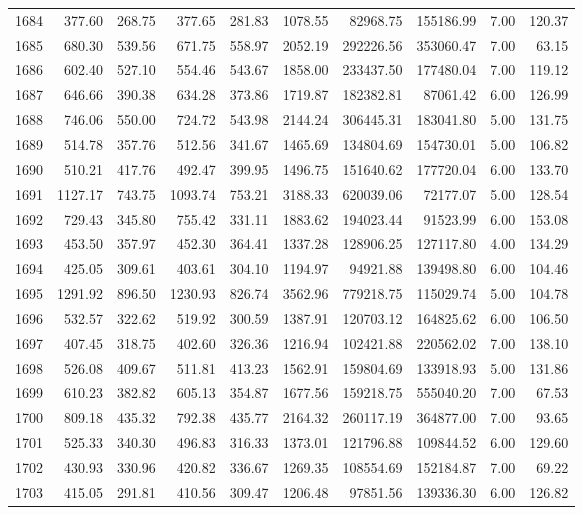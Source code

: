 \begin{tabular}{lrrrrrrrrr}
1684 & 377.60 & 268.75 & 377.65 & 281.83 & 1078.55 & 82968.75 & 155186.99 & 7.00 & 120.37 \\
1685 & 680.30 & 539.56 & 671.75 & 558.97 & 2052.19 & 292226.56 & 353060.47 & 7.00 & 63.15 \\
1686 & 602.40 & 527.10 & 554.46 & 543.67 & 1858.00 & 233437.50 & 177480.04 & 7.00 & 119.12 \\
1687 & 646.66 & 390.38 & 634.28 & 373.86 & 1719.87 & 182382.81 & 87061.42 & 6.00 & 126.99 \\
1688 & 746.06 & 550.00 & 724.72 & 543.98 & 2144.24 & 306445.31 & 183041.80 & 5.00 & 131.75 \\
1689 & 514.78 & 357.76 & 512.56 & 341.67 & 1465.69 & 134804.69 & 154730.01 & 5.00 & 106.82 \\
1690 & 510.21 & 417.76 & 492.47 & 399.95 & 1496.75 & 151640.62 & 177720.04 & 6.00 & 133.70 \\
1691 & 1127.17 & 743.75 & 1093.74 & 753.21 & 3188.33 & 620039.06 & 72177.07 & 5.00 & 128.54 \\
1692 & 729.43 & 345.80 & 755.42 & 331.11 & 1883.62 & 194023.44 & 91523.99 & 6.00 & 153.08 \\
1693 & 453.50 & 357.97 & 452.30 & 364.41 & 1337.28 & 128906.25 & 127117.80 & 4.00 & 134.29 \\
1694 & 425.05 & 309.61 & 403.61 & 304.10 & 1194.97 & 94921.88 & 139498.80 & 6.00 & 104.46 \\
1695 & 1291.92 & 896.50 & 1230.93 & 826.74 & 3562.96 & 779218.75 & 115029.74 & 5.00 & 104.78 \\
1696 & 532.57 & 322.62 & 519.92 & 300.59 & 1387.91 & 120703.12 & 164825.62 & 6.00 & 106.50 \\
1697 & 407.45 & 318.75 & 402.60 & 326.36 & 1216.94 & 102421.88 & 220562.02 & 7.00 & 138.10 \\
1698 & 526.08 & 409.67 & 511.81 & 413.23 & 1562.91 & 159804.69 & 133918.93 & 5.00 & 131.86 \\
1699 & 610.23 & 382.82 & 605.13 & 354.87 & 1677.56 & 159218.75 & 555040.20 & 7.00 & 67.53 \\
1700 & 809.18 & 435.32 & 792.38 & 435.77 & 2164.32 & 260117.19 & 364877.00 & 7.00 & 93.65 \\
1701 & 525.33 & 340.30 & 496.83 & 316.33 & 1373.01 & 121796.88 & 109844.52 & 6.00 & 129.60 \\
1702 & 430.93 & 330.96 & 420.82 & 336.67 & 1269.35 & 108554.69 & 152184.87 & 7.00 & 69.22 \\
1703 & 415.05 & 291.81 & 410.56 & 309.47 & 1206.48 & 97851.56 & 139336.30 & 6.00 & 126.82 \\

\end{tabular}
